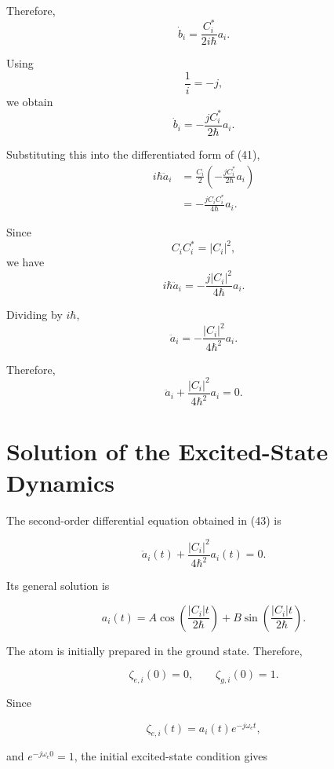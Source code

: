 \documentclass[12pt,a4paper]{article}
\begin{document}
Therefore,
\[
\dot b_i
=
\frac{C_i^{*}}{2i\hbar}a_i.
\]

Using
\[
\frac{1}{i}=-j,
\]
we obtain
\[
\dot b_i
=
-\frac{jC_i^{*}}{2\hbar}a_i.
\]

Substituting this into the differentiated form of (41),
\[
\begin{aligned}
i\hbar\ddot a_i
&=
\frac{C_i}{2}
\left(
-\frac{jC_i^{*}}{2\hbar}a_i
\right)\\
&=
-\frac{jC_iC_i^{*}}{4\hbar}a_i.
\end{aligned}
\]

Since
\[
C_iC_i^{*}
=
|C_i|^2,
\]
we have
\[
i\hbar\ddot a_i
=
-\frac{j|C_i|^2}{4\hbar}a_i.
\]

Dividing by \(i\hbar\),
\[
\ddot a_i
=
-\frac{|C_i|^2}{4\hbar^2}a_i.
\]

Therefore,
\begin{equation}
\boxed{
\ddot a_i
+
\frac{|C_i|^2}{4\hbar^2}a_i
=
0.
}
\tag{43}
\end{equation}

\section{Solution of the Excited-State Dynamics}

The second-order differential equation obtained in (43) is

\begin{equation}
\ddot{a}_i(t)
+
\frac{|C_i|^2}{4\hbar^2}a_i(t)
=0.
\tag{44}
\end{equation}

Its general solution is

\begin{equation}
a_i(t)
=
A\cos\left(\frac{|C_i|t}{2\hbar}\right)
+
B\sin\left(\frac{|C_i|t}{2\hbar}\right).
\tag{45}
\end{equation}

The atom is initially prepared in the ground state. Therefore,

\begin{equation}
\zeta_{e,i}(0)=0,
\qquad
\zeta_{g,i}(0)=1.
\tag{46}
\end{equation}

Since

\begin{equation}
\zeta_{e,i}(t)=a_i(t)e^{-j\omega_e t},
\tag{47}
\end{equation}

and $e^{-j\omega_e 0}=1$, the initial excited-state condition gives
\end{document}

